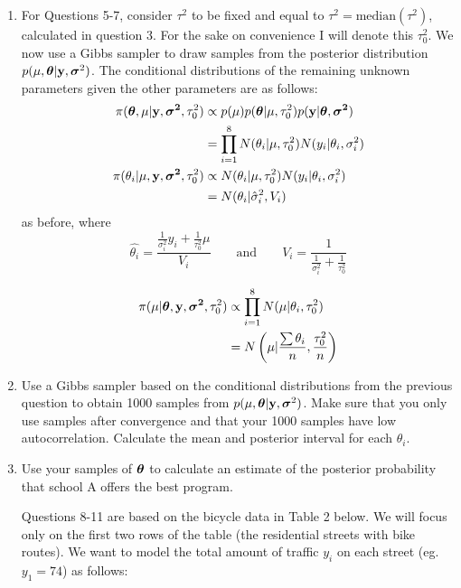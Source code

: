 \documentclass[12pt]{article}
\def\y{\mathbf{y}}
\newcommand{\si}{\mbox{\boldmath $\sigma$}}
\newcommand{\bth}{\mbox{\boldmath $\theta$}}
\begin{document}
\begin{enumerate}
	
	\item For Questions 5-7, consider $\tau^2$ to be fixed and equal to $\tau^2 = \mbox{median}(\tau^2)$, calculated in question 3. For the sake on convenience I will denote this $\tau_0^2$. We now use a Gibbs sampler to draw samples from the posterior distribution $p(\mu,\bth|\y,\si^2)$. The conditional distributions of the remaining unknown parameters given the other parameters are as follows:
	\begin{align}
		\pi(\bth, \mu | \mathbf{y}, \mathbf{\si^2}, \tau_0^2) & \propto p(\mu) p(\bth|\mu, \tau_0^2) p(\mathbf{y}| \bth, \mathbf{\si^2}) \nonumber \\
		& = \prod_{i=1}^8 N(\theta_i|\mu, \tau_0^2) N(y_i|\theta_i, \sigma_i^2) \\
		\pi(\theta_i|\mu, \mathbf{y}, \mathbf{\si^2}, \tau_0^2) & \propto N(\theta_i|\mu, \tau_0^2) N(y_i|\theta_i, \sigma_i^2) \nonumber \\
		& = N(\theta_i | \hat{\sigma}_i^2, V_i)
	\end{align}
	as before, where \[\hat{\theta_i} = \dfrac{\frac{1}{\sigma^2_i}y_i + \frac{1}{\tau_0^2}\mu}{V_i} \qquad  \mathrm{ and } \qquad V_i=\dfrac{1}{\frac{1}{\sigma^2_i} + \frac{1}{\tau_0^2}}
	\]
	
	\begin{align}
		\pi(\mu | \bth, \mathbf{y}, \mathbf{\si^2}, \tau_0^2) & \propto \prod_{i=1}^8 N(\mu| \theta_i, \tau_0^2) \nonumber\\
		& =  N\left(\mu \vert \frac{\sum\theta_i}{n} ,  \frac{\tau_0^2}{n}\right)
	\end{align}
	
	\item Use a Gibbs sampler based on the conditional distributions from the previous question to obtain 1000 samples from $p(\mu,\bth|\y,\si^2)$. Make sure that you only use samples after convergence and that your 1000 samples have low autocorrelation. Calculate the mean and posterior interval for each $\theta_i$.
	
	\item Use your samples of $\bth$ to calculate an estimate of the posterior probability that school A offers the best program.
	
	\vspace{.05cm} Questions 8-11 are based on the bicycle data in Table 2 below. We will focus only on the first two rows of the table (the residential streets with bike routes). We want to model the total amount of traffic $y_i$ on each street (eg. $y_1=74$) as follows:
	

\end{enumerate}
\end{document}
